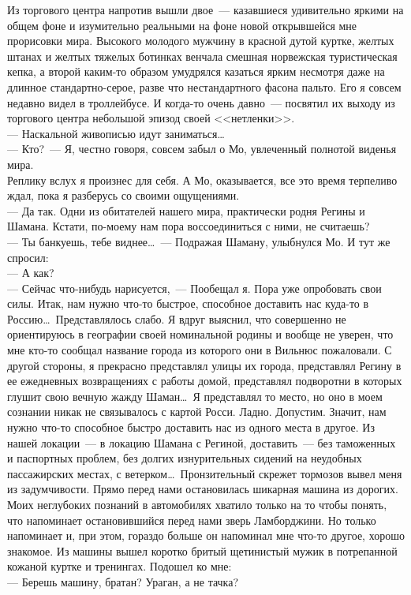 Из торгового центра напротив вышли двое~--- казавшиеся удивительно яркими на 
общем фоне и изумительно реальными на фоне новой открывшейся мне прорисовки мира. 
Высокого молодого мужчину в красной дутой куртке, желтых штанах и желтых 
тяжелых ботинках венчала смешная норвежская туристическая кепка, а второй каким-то 
образом умудрялся казаться ярким несмотря даже на длинное стандартно-серое, 
разве что нестандартного фасона пальто. Его я совсем недавно видел в 
троллейбусе. И когда-то очень давно~--- посвятил их выходу из торгового центра 
небольшой эпизод своей <<нетленки>>.\\
--- Наскальной живописью идут заниматься\ldots\\
--- Кто?~--- Я, честно говоря, совсем забыл о Мо, увлеченный полнотой виденья 
мира.\\ 
Реплику вслух я произнес для себя. А Мо, оказывается, все это время терпеливо 
ждал, пока я разберусь со своими ощущениями.\\
--- Да так. Одни из обитателей нашего мира, практически родня Регины и Шамана. 
Кстати, по-моему нам пора воссоединиться с ними, не считаешь?\\
--- Ты банкуешь, тебе виднее\ldots~--- Подражая Шаману, улыбнулся Мо. И тут же 
спросил:\\
--- А как?\\
--- Сейчас что-нибудь нарисуется,~--- Пообещал я. Пора уже опробовать свои силы. 
Итак, нам нужно что-то быстрое, способное доставить нас куда-то в Россию\ldots\
Представлялось слабо. Я вдруг выяснил, что совершенно не ориентируюсь в 
географии своей номинальной родины и вообще не уверен, что мне кто-то сообщал 
название города из которого они в Вильнюс пожаловали. С другой стороны, я 
прекрасно представлял улицы их города, представлял Регину в ее ежедневных 
возвращениях с работы домой, представлял подворотни в которых глушит свою 
вечную жажду Шаман\ldots\ Я представлял то место, но оно в моем сознании никак не 
связывалось с картой Росси. Ладно. Допустим. Значит, нам нужно что-то способное быстро 
доставить нас из одного места в другое. Из нашей локации~--- в локацию Шамана с 
Региной, доставить~--- без таможенных и паспортных проблем, без долгих 
изнурительных сидений на неудобных пассажирских местах, с ветерком\ldots\
Пронзительный скрежет тормозов вывел меня из задумчивости. Прямо перед нами 
остановилась шикарная машина из дорогих. Моих неглубоких познаний в автомобилях 
хватило только на то чтобы понять, что напоминает остановившийся перед нами 
зверь Ламборджини. Но только напоминает и, при этом, гораздо больше он 
напоминал мне что-то другое, хорошо знакомое. Из машины вышел коротко бритый щетинистый 
мужик в потрепанной кожаной куртке и тренингах. Подошел ко мне:\\
--- Берешь машину, братан? Ураган, а не тачка?


